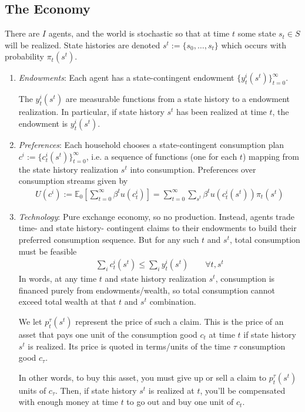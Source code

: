 \documentclass[12pt]{article}
\theoremstyle{plain}
\theoremstyle{definition}
\theoremstyle{remark}
\newcommand{\E}{\mathbb{E}}
\newcommand{\sumtinfz}{\sum^\infty_{t=0}}
\newcommand{\tinfz}{^\infty_{t=0}}
\begin{document}
\subsection{The Economy}
There are $I$ agents, and the world is stochastic so that at time $t$
some state $s_t\in S$ will be realized. State histories are denoted
$s^t:=\{s_0,\ldots,s_t\}$
which occurs with probability $\pi_t(s^t)$.
\begin{enumerate}
  \item \emph{Endowments}: Each agent has a state-contingent endowment
    $\{y^i_t(s^t)\}\tinfz$.

    The $y_t^i(s^t)$ are measurable functions from a state history to a
    endowment realization.  In particular, if state history $s^t$ has
    been realized at time $t$, the endowment is $y_t^i(s^t)$.
  \item \emph{Preferences}:
    Each household chooses a state-contingent consumption plan
    $c^i := \{c_t^i(s^t)\}\tinfz$, i.e. a sequence of functions (one for
    each $t$) mapping from the state history realization $s^t$ into
    consumption.
    Preferences over consumption streams given by
    \begin{align}
      U(c^i) :=
      \E_0\left[
      \sumtinfz \beta^t
        u(c_t^i)
      \right]
      =
      \sumtinfz
        \sum_{s^t}
        \beta^t
        u\left(c_t^i(s^t)\right)\pi_t(s^t)
      \label{ad:objfcn}
    \end{align}
  \item \emph{Technology}:
    Pure exchange economy, so no production. Instead, agents trade
    time- and state history- contingent claims to their endowments to
    build their preferred consumption sequence.
    But for any such $t$ and $s^t$, total consumption must be feasible
    \begin{align*}
      \sum_i c_t^i(s^t) \leq \sum_i y_t^i(s^t)
      \qquad \forall t,s^t
    \end{align*}
    In words, at any time $t$ and state history realization $s^t$,
    consumption is financed purely from endowments/wealth, so total
    consumption cannot exceed total wealth at that $t$ and $s^t$
    combination.

    We let $p_t^\tau(s^t)$ represent the price of such a claim. This is
    the price of an asset that pays one unit of the consumption good
    $c_t$ at time $t$ if state history $s^t$ is realized.
    Its price is quoted in terms/units of the time $\tau$ consumption
    good $c_\tau$.

    In other words, to buy this asset, you must give up or sell a claim
    to $p_t^\tau(s^t)$ units of $c_\tau$. Then, if state history $s^t$
    is realized at $t$, you'll be compensated with enough money at time
    $t$ to go out and buy one unit of $c_t$.
\end{enumerate}
\end{document}
